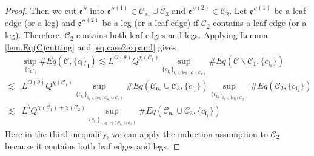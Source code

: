 \begin{proof}
Then we cut $\mathfrak{e}''$ into $\mathfrak{e}''^{(1)}\in  \mathcal{C}_{\mathfrak{n}_*}\cup \mathcal{C}_3$ and $\mathfrak{e}''^{(2)}\in  \mathcal{C}_2$. Let $\mathfrak{e}''^{(1)}$ be a leaf edge (or a leg) and $\mathfrak{e}''^{(2)}$ be a leg (or a leaf edge) if $\mathcal{C}_2$ contains a leaf edge (or a leg). Therefore, $\mathcal{C}_2$ contains both leaf edges and legs. Applying Lemma \ref{lem.Eq(C)cutting} and \eqref{eq.case2expand} gives
\begin{equation}\label{eq.case2expand'}
\begin{split}
    &\sup_{\{c_{\mathfrak{l}}\}_{\mathfrak{l}}}\#Eq(\mathcal{C},\{c_{\mathfrak{l}}\}_{\mathfrak{l}})
    \lesssim  L^{O(\theta)} Q^{\chi(\mathcal{C}_1)}\sup_{\{c_{\mathfrak{l}_1}\}_{\mathfrak{l}_1\in \text{leg}(\mathcal{C}\backslash\mathcal{C}_1)} } \# Eq(\mathcal{C}\backslash\mathcal{C}_1,\{c_{\mathfrak{l}_1}\})
    \\
    \lesssim& L^{O(\theta)} Q^{\chi(\mathcal{C}_1)}\sup_{\{c_{\mathfrak{l}_1}\}_{\mathfrak{l}_1\in \text{leg}(\mathcal{C}_{\mathfrak{n}_*}\cup \mathcal{C}_3)} } \# Eq(\mathcal{C}_{\mathfrak{n}_*}\cup \mathcal{C}_3,\{c_{\mathfrak{l}_1}\}) \sup_{\{c_{\mathfrak{l}_2}\}_{\mathfrak{l}_2\in \text{leg}(\mathcal{C}_2)} }\# Eq(\mathcal{C}_{2}, \{c_{\mathfrak{l}_2}\})
    \\
    \lesssim& L^\theta Q^{\chi(\mathcal{C}_1)+\chi(\mathcal{C}_2)}\sup_{\{c_{\mathfrak{l}_1}\}_{\mathfrak{l}_1\in \text{leg}(\mathcal{C}_{\mathfrak{n}_*}\cup \mathcal{C}_3)} } \# Eq(\mathcal{C}_{\mathfrak{n}_*}\cup \mathcal{C}_3,\{c_{\mathfrak{l}_1}\}) 
\end{split}
\end{equation}
Here in the third inequality, we can apply the induction assumption to $\mathcal{C}_2$ because it contains both leaf edges and legs.


\end{proof}
